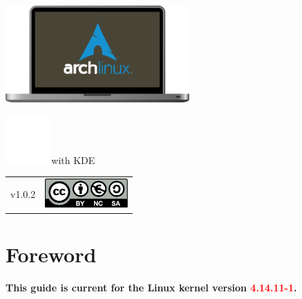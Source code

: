 \vspace*{\fill}
\includegraphics[height=10em]{img/ArchMBP.pdf}\linebreak
\begin{mdframed}[style=titlebox]
	\centering
	\begin{Huge}
		\par
	\end{Huge}
\end{mdframed}
\vspace*{2em}
\includegraphics[height=5em]{img/kde-logo.pdf}with KDE\par
\vspace*{\fill}
\begin{tabularx}{0.95\textwidth}{lR}
	v1.0.2 & \includegraphics[height=3em]{../common/licenses/by-nc-sa_eu.pdf}
\end{tabularx}
\vspace*{2em}

\setcounter{page}{1}
\pagecolor{white}
\color{dark}
\normalsize\justify
\tableofcontents
\clearpage

\clearpage
\section{Foreword}

\begin{flushright}
	\textbf{This guide is current for the Linux kernel version \textcolor{red}{4.14.11-1}.}
\end{flushright}

